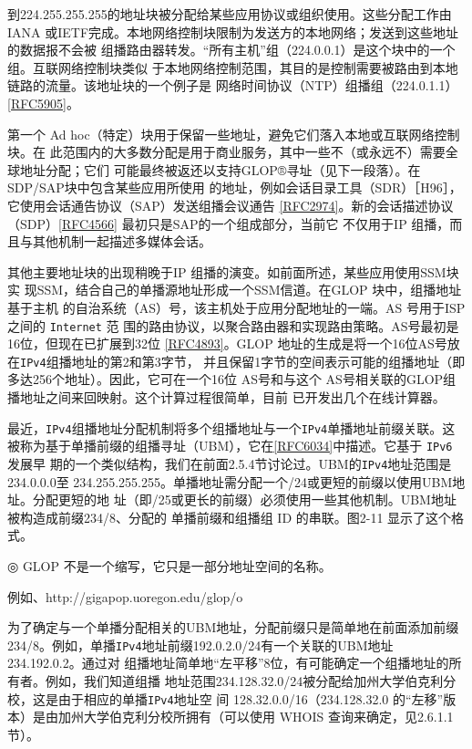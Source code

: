 到224.255.255.255的地址块被分配给某些应用协议或组织使用。这些分配工作由IANA
或IETF完成。本地网络控制块限制为发送方的本地网络；发送到这些地址的数据报不会被
组播路由器转发。“所有主机”组（224.0.0.1）是这个块中的一个组。互联网络控制块类似
于本地网络控制范围，其目的是控制需要被路由到本地链路的流量。该地址块的一个例子是
网络时间协议（NTP）组播组（224.0.1.1）\href{https://www.rfc-editor.org/rfc/rfc5905}{[RFC5905]}。

第一个 Ad hoc（特定）块用于保留一些地址，避免它们落入本地或互联网络控制块。在
此范围内的大多数分配是用于商业服务，其中一些不（或永远不）需要全球地址分配；它们
可能最终被返还以支持GLOP®寻址（见下一段落）。在SDP/SAP块中包含某些应用所使用
的地址，例如会话目录工具（SDR）［H96］，它使用会话通告协议（SAP）发送组播会议通告
\href{https://www.rfc-editor.org/rfc/rfc2974}{[RFC2974]}。新的会话描述协议（SDP）\href{https://www.rfc-editor.org/rfc/rfc4566}{[RFC4566]} 最初只是SAP的一个组成部分，当前它
不仅用于IP 组播，而且与其他机制一起描述多媒体会话。

其他主要地址块的出现稍晚于IP 组播的演变。如前面所述，某些应用使用SSM块实
现SSM，结合自己的单播源地址形成一个SSM信道。在GLOP 块中，组播地址基于主机
的自治系统（AS）号，该主机处于应用分配地址的一端。AS 号用于ISP 之间的 \verb|Internet| 范
围的路由协议，以聚合路由器和实现路由策略。AS号最初是16位，但现在已扩展到32位
\href{https://www.rfc-editor.org/rfc/rfc4893}{[RFC4893]}。GLOP 地址的生成是将一个16位AS号放在\verb|IPv4|组播地址的第2和第3字节，
并且保留1字节的空间表示可能的组播地址（即多达256个地址）。因此，它可在一个16位
AS号和与这个 AS号相关联的GLOP组播地址之间来回映射。这个计算过程很简单，目前
已开发出几个在线计算器。

最近，\verb|IPv4|组播地址分配机制将多个组播地址与一个\verb|IPv4|单播地址前缀关联。这
被称为基于单播前缀的组播寻址（UBM），它在\href{https://www.rfc-editor.org/rfc/rfc6034}{[RFC6034]}中描述。它基于 \verb|IPv6| 发展早
期的一个类似结构，我们在前面2.5.4节讨论过。UBM的\verb|IPv4|地址范围是234.0.0.0至
234.255.255.255。单播地址需分配一个/24或更短的前缀以使用UBM地址。分配更短的地
址（即/25或更长的前缀）必须使用一些其他机制。UBM地址被构造成前缀234/8、分配的
单播前缀和组播组 ID 的串联。图2-11 显示了这个格式。

◎ GLOP 不是一个缩写，它只是一部分地址空间的名称。

例如、http://gigapop.uoregon.edu/glop/o

为了确定与一个单播分配相关的UBM地址，分配前缀只是简单地在前面添加前缀
234/8。例如，单播\verb|IPv4|地址前缀192.0.2.0/24有一个关联的UBM地址234.192.0.2。通过对
组播地址简单地“左平移”8位，有可能确定一个组播地址的所有者。例如，我们知道组播
地址范围234.128.32.0/24被分配给加州大学伯克利分校，这是由于相应的单播\verb|IPv4|地址空
间 128.32.0.0/16（234.128.32.0 的“左移”版本）是由加州大学伯克利分校所拥有（可以使用
WHOIS 查询来确定，见2.6.1.1节）。

